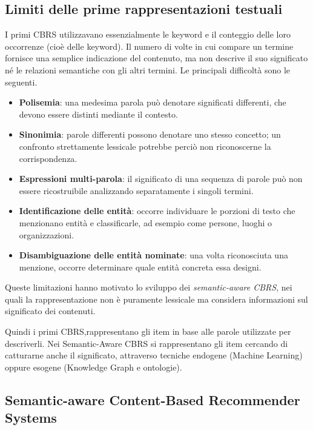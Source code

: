 \subsection{Limiti delle prime rappresentazioni testuali}
I primi CBRS utilizzavano essenzialmente le keyword e il conteggio delle loro occorrenze (cioè delle keyword). Il numero di volte in cui compare un termine fornisce una semplice indicazione del contenuto, ma non descrive il suo significato né le relazioni semantiche con gli altri termini. Le principali difficoltà sono le seguenti.
\begin{itemize}
    \item \textbf{Polisemia}: una medesima parola può denotare significati differenti, che devono essere distinti mediante il contesto.
    \item \textbf{Sinonimia}: parole differenti possono denotare uno stesso concetto; un confronto strettamente lessicale potrebbe perciò non riconoscerne la corrispondenza.
    \item \textbf{Espressioni multi-parola}: il significato di una sequenza di parole può non essere ricostruibile analizzando separatamente i singoli termini.
    \item \textbf{Identificazione delle entità}: occorre individuare le porzioni di testo che menzionano entità e classificarle, ad esempio come persone, luoghi o organizzazioni.
    \item \textbf{Disambiguazione delle entità nominate}: una volta riconosciuta una menzione, occorre determinare quale entità concreta essa designi.
\end{itemize}
Queste limitazioni hanno motivato lo sviluppo dei \emph{semantic-aware CBRS}, nei quali la rappresentazione non è puramente lessicale ma considera informazioni sul significato dei contenuti.

Quindi i primi CBRS,rappresentano gli item in base alle parole utilizzate per descriverli.
Nei Semantic-Aware CBRS si rappresentano gli item cercando di catturarne anche il significato, attraverso tecniche endogene (Machine Learning) oppure esogene (Knowledge Graph e ontologie).


\subsection{Semantic-aware Content-Based Recommender Systems}


